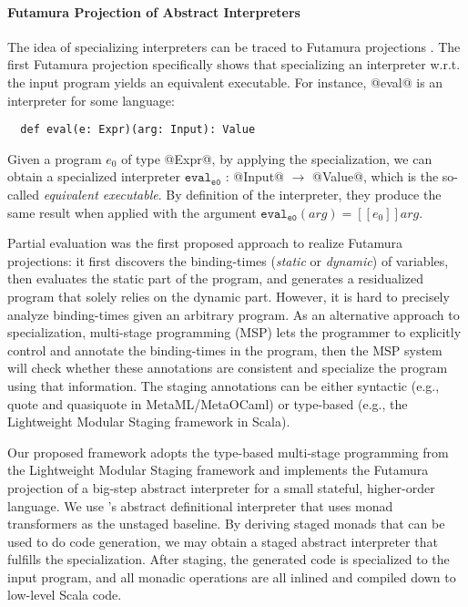 \paragraph{Futamura Projection of Abstract Interpreters}

The idea of specializing interpreters can be traced to Futamura
projections \cite{Futamura1999, futamura1971partial}.  The first
Futamura projection specifically shows that specializing an
interpreter w.r.t. the input program yields an equivalent
executable. For instance, @eval@ is an interpreter for some language:
\begin{lstlisting}
  def eval(e: Expr)(arg: Input): Value
\end{lstlisting}
Given a program $e_0$ of type @Expr@, by applying the specialization,
we can obtain a specialized interpreter $\texttt{eval}_{\texttt{e0}}$
: @Input@ $\to$ @Value@, which is the so-called \textit{equivalent
  executable}.  By definition of the interpreter, they produce the
same result when applied with the argument
$\texttt{eval}_{\texttt{e0}}(arg) = [\![ e_0 ]\!] arg $.

Partial evaluation \cite{DBLP:books/daglib/0072559} was the first
proposed approach to realize Futamura projections: it first discovers
the binding-times (\textit{static} or \textit{dynamic}) of variables,
then evaluates the static part of the program, and generates a
residualized program that solely relies on the dynamic part. However,
it is hard to precisely analyze binding-times given an arbitrary
program.  As an alternative approach to specialization, multi-stage
programming (MSP) \cite{taha1999multi, DBLP:conf/pepm/TahaS97} lets
the programmer to explicitly control and annotate the binding-times in
the program, then the MSP system will check whether these annotations
are consistent and specialize the program using that information.  The
staging annotations can be either syntactic (e.g., quote and
quasiquote in MetaML/MetaOCaml) or type-based (e.g., the Lightweight
Modular Staging framework \cite{DBLP:conf/gpce/RompfO10} in Scala).

Our proposed framework adopts the type-based multi-stage programming
from the Lightweight Modular Staging framework and implements the
Futamura projection of a big-step abstract interpreter for a small
stateful, higher-order language.  We use
\citet{DBLP:journals/pacmpl/DaraisLNH17}'s abstract definitional
interpreter that uses monad transformers as the unstaged baseline. By
deriving staged monads that can be used to do code generation, we may
obtain a staged abstract interpreter that fulfills the specialization.
After staging, the generated code is specialized to the input program,
and all monadic operations are all inlined and compiled down to
low-level Scala code.


